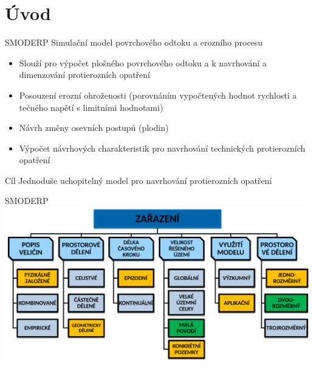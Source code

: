 \section{Úvod}

    \begin{frame}[fragile]{SMODERP}
        Simulační model povrchového odtoku a erozního procesu\\[1em]
            \begin{itemize}
                \item Slouží pro výpočet plošného povrchového odtoku a k navrhování a dimenzování protierozních opatření
                \item Posouzení erozní ohroženosti (porovnáním vypočtených hodnot rychlosti a tečného napětí s limitními hodnotami)
                \item Návrh změny osevních postupů (plodin)
                \item Výpočet návrhových charakteristik pro navrhování technických protierozních opatření
            \end{itemize}\vspace{1em}
        \begin{block}{Cíl}
        Jednoduše uchopitelný model pro navrhování protierozních opatření 
        \end{block}
    \end{frame}

    \begin{frame}{SMODERP}
        \includegraphics[width=\textwidth]{obr/vyuziti.png}
    \end{frame}

